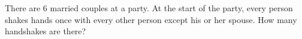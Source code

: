 There are $6$ married couples at a party. At the start of the party, every person shakes hands once with every other person except his or her spouse. How many handshakes are there?
